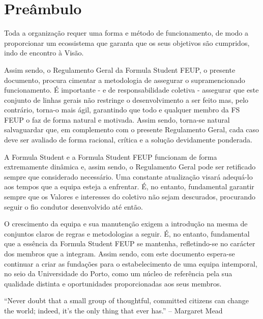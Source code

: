 \chapter{Preâmbulo}

Toda a organização requer uma forma e método de funcionamento, de modo a proporcionar um ecossistema que garanta que os seus objetivos são cumpridos, indo de encontro à Visão.

Assim sendo, o Regulamento Geral da Formula Student FEUP, o presente documento, procura cimentar a metodologia de assegurar o supramencionado funcionamento. É importante - e de responsabilidade coletiva - assegurar que este conjunto de linhas gerais não restringe o desenvolvimento a ser feito mas, pelo contrário, torna-o mais ágil, garantindo que todo e qualquer membro da FS FEUP o faz de forma natural e motivada. Assim sendo, torna-se natural salvaguardar que, em complemento com o presente Regulamento Geral, cada caso deve ser avaliado de forma racional, crítica e a solução devidamente ponderada.

A Formula Student e a Formula Student FEUP funcionam de forma extremamente dinâmica e, assim sendo, o Regulamento Geral pode ser retificado sempre que considerado necessário. Uma constante atualização visará adequá-lo aos tempos que a equipa esteja a enfrentar. É, no entanto, fundamental garantir sempre que os Valores e interesses do coletivo não sejam descurados, procurando seguir o fio condutor desenvolvido até então.

O crescimento da equipa e sua manutenção exigem a introdução na mesma de conjuntos claros de regras e metodologias a seguir. É, no entanto, fundamental que a essência da Formula Student FEUP se mantenha, refletindo-se no carácter dos membros que a integram. Assim sendo, com este documento espera-se continuar a criar as fundações para o estabelecimento de uma equipa intemporal, no seio da Universidade do Porto, como um núcleo de referência pela sua qualidade distinta e oportunidades proporcionadas aos seus membros.

``Never doubt that a small group of thoughtful, committed citizens can change the world; indeed, it's the only thing that ever has.'' -- Margaret Mead
